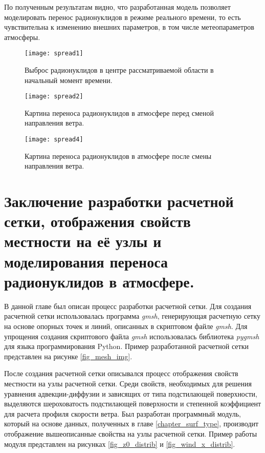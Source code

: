 По полученным результатам видно, что разработанная модель позволяет моделировать перенос радионуклидов в режиме реального
времени, то есть чувствительна к изменению внешних параметров, в том числе метеопараметров атмосферы.

\begin{figure}[ht!]
    \centering
    \texttt{[image: spread1]}
    \captionsetup{justification=centering}
    \caption{Выброс радионуклидов в центре рассматриваемой области в начальный момент времени.}
    \label{fig_nuclindes_spread_1}
\end{figure}

\begin{figure}[ht!]
    \centering
    \texttt{[image: spread2]}
    \captionsetup{justification=centering}
    \caption{Картина переноса радионуклидов в атмосфере перед сменой направления ветра.}
    \label{fig_nuclindes_spread_2}
\end{figure}

\begin{figure}[ht!]
    \centering
    \texttt{[image: spread4]}
    \captionsetup{justification=centering}
    \caption{Картина переноса радионуклидов в атмосфере после смены направления ветра.}
    \label{fig_nuclindes_spread_3}
\end{figure}

\section{Заключение разработки расчетной сетки, отображения свойств местности на её узлы и моделирования переноса 
радионуклидов в атмосфере.}

В данной главе был описан процесс разработки расчетной сетки. Для создания расчетной сетки использовалась программа 
\textit{gmsh}, генерирующая расчетную сетку на основе опорных точек и линий, описанных в скриптовом файле \textit{gmsh}. 
Для упрощения создания скриптового файла \textit{gmsh} использовалась библиотека \textit{pygmsh} для языка 
программирования Python. Пример разработанной расчетной сетки представлен на рисунке \ref{fig_mesh_img}.

После создания расчетной сетки описывался процесс отображения свойств местности на узлы расчетной сетки. Среди свойств, 
необходимых для решения уравнения адвекции-диффузии и зависящих от типа подстилающей поверхности, выделяются 
шероховатость подстилающей поверхности и степенной коэффициент для расчета профиля скорости ветра. Был разработан 
программный модуль, который на основе данных, полученных в главе \ref{chapter_surf_type}, производит отображение 
вышеописанные свойства на узлы расчетной сетки. Пример работы модуля представлен на рисунках \ref{fig_z0_distrib} и 
\ref{fig_wind_x_distrib}.

